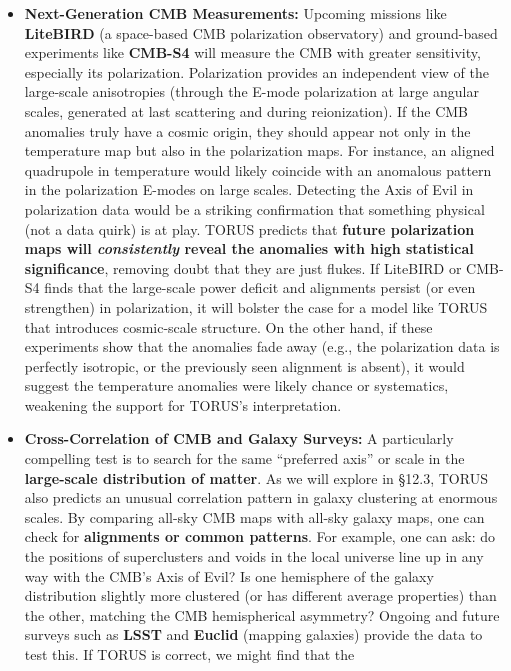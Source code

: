 \documentclass[]{article}
\begin{document}
\begin{itemize}
\item
  \textbf{Next-Generation CMB Measurements:} Upcoming missions like
  \textbf{LiteBIRD} (a space-based CMB polarization observatory) and
  ground-based experiments like \textbf{CMB-S4} will measure the CMB
  with greater sensitivity, especially its polarization. Polarization
  provides an independent view of the large-scale anisotropies (through
  the E-mode polarization at large angular scales, generated at last
  scattering and during reionization). If the CMB anomalies truly have a
  cosmic origin, they should appear not only in the temperature map but
  also in the polarization maps. For instance, an aligned quadrupole in
  temperature would likely coincide with an anomalous pattern in the
  polarization E-modes on large scales. Detecting the Axis of Evil in
  polarization data would be a striking confirmation that something
  physical (not a data quirk) is at play. TORUS predicts that
  \textbf{future polarization maps will \emph{consistently} reveal the
  anomalies with high statistical significance}, removing doubt that
  they are just flukes​. If LiteBIRD or CMB-S4 finds that the
  large-scale power deficit and alignments persist (or even strengthen)
  in polarization, it will bolster the case for a model like TORUS that
  introduces cosmic-scale structure. On the other hand, if these
  experiments show that the anomalies fade away (e.g., the polarization
  data is perfectly isotropic, or the previously seen alignment is
  absent), it would suggest the temperature anomalies were likely chance
  or systematics, weakening the support for TORUS's interpretation.
\item
  \textbf{Cross-Correlation of CMB and Galaxy Surveys:} A particularly
  compelling test is to search for the same ``preferred axis'' or scale
  in the \textbf{large-scale distribution of matter}. As we will explore
  in §12.3, TORUS also predicts an unusual correlation pattern in galaxy
  clustering at enormous scales. By comparing all-sky CMB maps with
  all-sky galaxy maps, one can check for \textbf{alignments or common
  patterns}. For example, one can ask: do the positions of superclusters
  and voids in the local universe line up in any way with the CMB's Axis
  of Evil? Is one hemisphere of the galaxy distribution slightly more
  clustered (or has different average properties) than the other,
  matching the CMB hemispherical asymmetry? Ongoing and future surveys
  such as \textbf{LSST} and \textbf{Euclid} (mapping galaxies) provide
  the data to test this. If TORUS is correct, we might find that the

\end{itemize}
\end{document}
